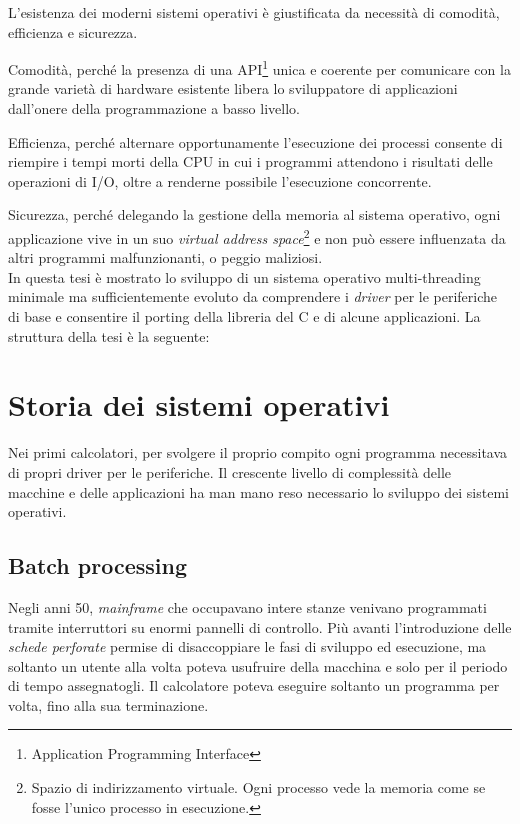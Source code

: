 \documentclass[12pt,a4paper]{report}
\begin{document}
	L'esistenza dei moderni sistemi operativi è giustificata da necessità di comodità, efficienza e sicurezza.
	
	Comodità, perché la presenza di una API\footnote{Application Programming Interface} unica e coerente per comunicare con
	la grande varietà di hardware esistente libera lo sviluppatore di applicazioni dall'onere della programmazione a basso livello.
	
	Efficienza, perché alternare opportunamente l'esecuzione dei processi consente di riempire i tempi morti della CPU in cui
	i programmi attendono i risultati delle operazioni di I/O, oltre a renderne possibile l'esecuzione concorrente.
	
	Sicurezza, perché delegando la gestione della memoria al sistema operativo, ogni applicazione vive in un suo
	\emph{virtual address space}\footnote{Spazio di indirizzamento virtuale. Ogni processo vede la memoria come se fosse
	l'unico processo in esecuzione.} e non può essere influenzata da altri programmi malfunzionanti, o peggio maliziosi.\\
	
	In questa tesi è mostrato lo sviluppo di un sistema operativo multi-threading minimale ma sufficientemente evoluto
	da comprendere i \emph{driver} per le periferiche di base e consentire il porting della libreria del C e di alcune applicazioni.
	La struttura della tesi è la seguente:


\chapter{Storia dei sistemi operativi}
	Nei primi calcolatori, per svolgere il proprio compito ogni programma necessitava di propri driver per le periferiche.
	Il crescente livello di complessità delle macchine e delle applicazioni ha man mano reso necessario lo sviluppo dei sistemi operativi.
	
	\section{Batch processing}
		Negli anni 50, \emph{mainframe} che occupavano intere stanze venivano programmati tramite interruttori su enormi pannelli di controllo.
		Più avanti l'introduzione delle \emph{schede perforate} permise di disaccoppiare le fasi di sviluppo
		ed esecuzione, ma soltanto un utente alla volta poteva usufruire della macchina e solo per il periodo di tempo assegnatogli.
		Il calcolatore poteva eseguire soltanto un programma per volta, fino alla sua terminazione.
		
\end{document}
